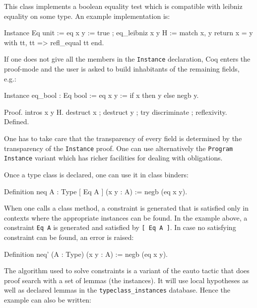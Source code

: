 This class implements a boolean equality test which is compatible with
leibniz equality on some type. An example implementation is:

\begin{coq_example*}
Instance Eq unit :=
  eq x y := true ;
  eq_leibniz x y H := 
    match x, y return x = y with tt, tt => refl_equal tt end.
\end{coq_example*}

If one does not give all the members in the \texttt{Instance}
declaration, Coq enters the proof-mode and the user is asked to build
inhabitants of the remaining fields, e.g.:

\begin{coq_example*}
Instance eq_bool : Eq bool :=
  eq x y := if x then y else negb y.
\end{coq_example*}

\begin{coq_example}
  Proof. intros x y H.
  destruct x ; destruct y ; try discriminate ; reflexivity. 
  Defined.
\end{coq_example}

One has to take care that the transparency of every field is determined
by the transparency of the \texttt{Instance} proof. One can use
alternatively the \texttt{Program} \texttt{Instance}  variant which has
richer facilities for dealing with obligations.


Once a type class is declared, one can use it in class binders:
\begin{coq_example}
  Definition neq {A : Type} [ Eq A ] (x y : A) := negb (eq x y).
\end{coq_example}

When one calls a class method, a constraint is generated that is
satisfied only in contexts where the appropriate instances can be
found. In the example above, a constraint \texttt{Eq A} is generated and
satisfied by \texttt{[ Eq A ]}. In case no satisfying constraint can be
found, an error is raised:

\begin{coq_example}
  Definition neq' (A : Type) (x y : A) := negb (eq x y).
\end{coq_example}

The algorithm used to solve constraints is a variant of the eauto tactic
that does proof search with a set of lemmas (the instances). It will use
local hypotheses as well as declared lemmas in the
\texttt{typeclass\_instances} database. Hence the example can also be
written:

